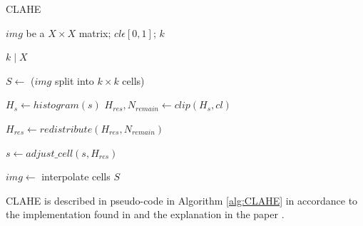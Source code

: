 \begin{algorithm}[h]
    \caption{CLAHE}\label{alg:CLAHE}
    \begin{algorithmic}[1]
        \Require $img$ be a $X\times X$ matrix; $cl \epsilon [0, 1]$; $k$

        \Ensure $k \mid X$

        \State $S \gets $ ($img$ split into $k\times k$ cells)\label{line:CLAHE:split}

            \State $H_s \gets histogram(s)$
            \State $H_{res}, N_{remain} \gets clip(H_s, cl)$

            \State $H_{res} \gets redistribute(H_{res}, N_{remain})$\label{line:CLAHE:redistribute}

            \State $s \gets adjust\_cell(s, H_{res})$
        \EndFor

        \State $img \gets$ interpolate cells $S$

    \end{algorithmic}
\end{algorithm}

CLAHE is described in pseudo-code in Algorithm \ref{alg:CLAHE} in accordance to the implementation found in \cite{site:CLAHE_code} and the explanation in the paper \cite{article:CLAHE_explanation}.


